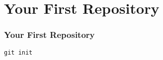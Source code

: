 \section[Section]{Your First Repository}

\begin{frame}
\frametitle{Your First Repository}
\alert{\texttt{git init}}
\end{frame}
